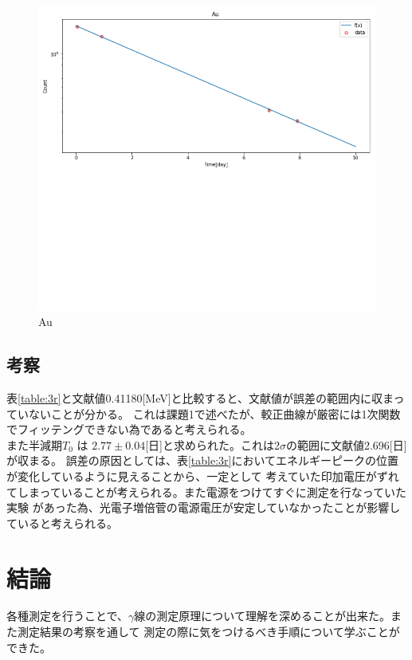 \documentclass[a4paper,12pt]{jarticle}
\begin{document}
  \begin{figure}[htbp]
   \begin{center}
   \includegraphics[clip,width=14.0cm]{Au.png}
    \caption{Au}
    \label{fig:Au}
   \end{center}
  \end{figure}

 \subsection{考察}
 表\ref{table:3r}と文献値0.41180[MeV]と比較すると、文献値が誤差の範囲内に収まっていないことが分かる。
 これは課題1で述べたが、較正曲線が厳密には1次関数でフィッテングできない為であると考えられる。\\
 また半減期$T_0$ は $2.77 \pm 0.04$[日]と求められた。これは2$\sigma$の範囲に文献値2.696[日]が収まる。
 誤差の原因としては、表\ref{table:3r}においてエネルギーピークの位置が変化しているように見えることから、一定として
 考えていた印加電圧がずれてしまっていることが考えられる。また電源をつけてすぐに測定を行なっていた実験
 があった為、光電子増倍菅の電源電圧が安定していなかったことが影響していると考えられる。

 \section{結論}
 各種測定を行うことで、$\gamma$線の測定原理について理解を深めることが出来た。また測定結果の考察を通して
 測定の際に気をつけるべき手順について学ぶことができた。
\end{document}
